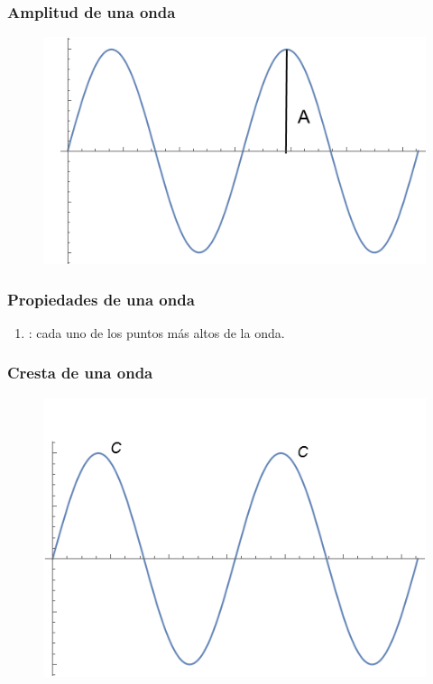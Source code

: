 \documentclass[14pt]{beamer}
\begin{document}
\begin{frame}
\frametitle{Amplitud de una onda}
\begin{figure}
    \centering
    \includegraphics[scale=0.8]{Imagenes/Plot_Onda_03.png}
\end{figure}
\end{frame}
\begin{frame}
\frametitle{Propiedades de una onda}
\begin{enumerate}[<+->]
\conti
\item {}: cada uno de los puntos más altos de la onda.
\seti
\end{enumerate}
\end{frame}
\begin{frame}
\frametitle{Cresta de una onda}
\begin{figure}
    \centering
    \includegraphics[scale=0.8]{Imagenes/Plot_Onda_04.png}
\end{figure}
\end{frame}
\end{document}
